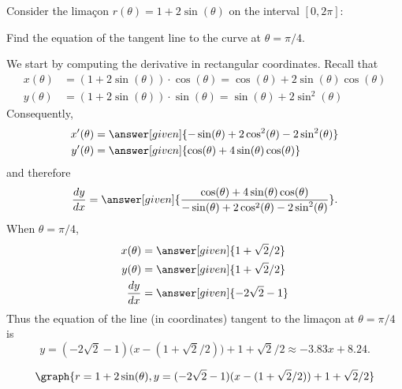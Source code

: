 \documentclass{ximera}
\begin{document}
\begin{example}
  Consider the lima\c{c}on $r(\theta) =1+2\sin(\theta)$ on the interval $[0,2\pi]$:
  \begin{image}
  \end{image}
  Find the equation of the tangent line to the curve at $\theta=\pi/4$.
  \begin{explanation}
    We start by computing the derivative in rectangular coordinates. Recall that
    \begin{align*}
      x(\theta) &= \left(1+2\sin(\theta)\right)\cdot \cos(\theta) = \cos(\theta)+2\sin(\theta)\cos(\theta)\\
      y(\theta) &= \left(1+2\sin(\theta)\right)\cdot \sin(\theta) = \sin(\theta)+2\sin^2(\theta)
    \end{align*}
    Consequently,
    \begin{align*}
      x'(\theta) &= \answer[given]{-\sin(\theta) + 2\cos^2(\theta)-2\sin^2(\theta)} \\
      y'(\theta) &= \answer[given]{\cos(\theta) + 4\sin(\theta)\cos(\theta)}
    \end{align*}
    and therefore
    \[
    \frac{dy}{dx} = \answer[given]{\frac{\cos(\theta) + 4\sin(\theta)\cos(\theta)}{-\sin(\theta) + 2\cos^2(\theta)-2\sin^2(\theta)}}.
    \]
    When $\theta=\pi/4$,
    \begin{align*}
      x(\theta) &= \answer[given]{1+\sqrt{2}/2}\\
      y(\theta) &=\answer[given]{1+\sqrt{2}/2}\\
    \frac{dy}{dx} &=\answer[given]{-2\sqrt{2}-1}
    \end{align*}
     Thus the equation of the line (in  coordinates) tangent to the lima\c{c}on at $\theta=\pi/4$ is
     \[
     y=(-2\sqrt{2}-1)\big(x-(1+\sqrt{2}/2)\big)+1+\sqrt{2}/2 \approx  -3.83 x+8.24.
     \]
    \begin{prompt}
      \[
      \graph{r=1+2\sin(\theta), y=(-2\sqrt{2}-1)(x-(1+\sqrt{2}/2))+1+\sqrt{2}/2}
      \]
    \end{prompt}
  \end{explanation}
\end{example}
\end{document}
